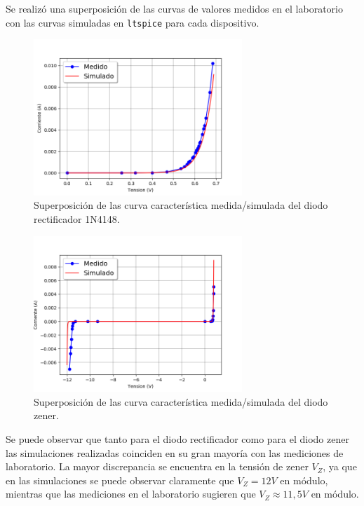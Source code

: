 \documentclass[a4paper]{article}
\begin{document}
Se realizó una superposición de las curvas de valores medidos en el laboratorio con las curvas simuladas en \texttt{ltspice} para cada dispositivo.

\begin{figure}[H]
	\centering
	\includegraphics[width=0.7\textwidth]{CurvaDiodoRectificador.png}
	\caption{Superposición de las curva característica medida/simulada del diodo rectificador 1N4148.}
	\label{fig:diodorect}
\end{figure}

\begin{figure}[H]
	\centering
	\includegraphics[width=0.7\textwidth]{CurvaZenerEntera.png}
	\caption{Superposición de las curva característica medida/simulada del diodo zener.}
	\label{fig:diodozen}
\end{figure}

Se puede observar que tanto para el diodo rectificador como para el diodo zener las simulaciones realizadas coinciden en su gran mayoría con las mediciones de laboratorio. La mayor discrepancia se encuentra en la tensión de zener $V_Z$, ya que en las simulaciones se puede observar claramente que $V_Z=12V$ en módulo, mientras que las mediciones en el laboratorio sugieren que $V_Z \approx 11,5V$ en módulo.
\end{document}
